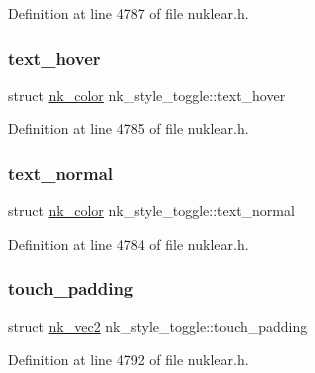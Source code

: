 Definition at line 4787 of file nuklear.\+h.

\mbox{\label{structnk__style__toggle_a60e3f7dbe4de71e4e93c887a57962367}} 
\subsubsection{\texorpdfstring{text\+\_\+hover}{text\_hover}}
{\footnotesize\ttfamily struct \mbox{\hyperlink{structnk__color}{nk\+\_\+color}} nk\+\_\+style\+\_\+toggle\+::text\+\_\+hover}



Definition at line 4785 of file nuklear.\+h.

\mbox{\label{structnk__style__toggle_a21ecdac052ef22bdecad6ad23476c6ea}} 
\subsubsection{\texorpdfstring{text\+\_\+normal}{text\_normal}}
{\footnotesize\ttfamily struct \mbox{\hyperlink{structnk__color}{nk\+\_\+color}} nk\+\_\+style\+\_\+toggle\+::text\+\_\+normal}



Definition at line 4784 of file nuklear.\+h.

\mbox{\label{structnk__style__toggle_a5734e9bce0fee5178808a98fd6eb5ce2}} 
\subsubsection{\texorpdfstring{touch\+\_\+padding}{touch\_padding}}
{\footnotesize\ttfamily struct \mbox{\hyperlink{structnk__vec2}{nk\+\_\+vec2}} nk\+\_\+style\+\_\+toggle\+::touch\+\_\+padding}



Definition at line 4792 of file nuklear.\+h.

